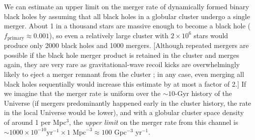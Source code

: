 \documentclass[iop,onecolumn]{revtex4}
\begin{document}
We can estimate an upper limit on the merger rate of dynamically formed binary black holes by assuming that all black holes in a globular cluster undergo a single merger.  About 1 in a thousand stars are massive enough to become a black hole ($f_\textrm{primary} \approx 0.001$), so even a relatively large cluster with $2\times 10^6$ stars would produce only 2000 black  holes and 1000 mergers.  [Although repeated mergers are possible if the black hole merger product is retained in the cluster and merges again, they are very rare as gravitational-wave recoil kicks are overwhelmingly likely to eject a merger remnant from the cluster \citep{Rodriguez:2018}; in any case, even merging all black holes sequentially would increase this estimate by at most a factor of 2.]  If we imagine that the merger rate is uniform over the $\sim 10$-Gyr history of the Universe (if mergers predominantly happened early in the cluster history, the rate in the local Universe would be lower), and with a globular cluster space density of around 1 per Mpc$^3$, the {\it upper limit} on the merger rate from this channel is $\sim 1000 \times 10^{-10} \textrm{yr}^{-1} \times 1 \textrm{ Mpc}^{-3} \approx 100$ Gpc$^{-3}$ yr$^{-1}$.
\end{document}
